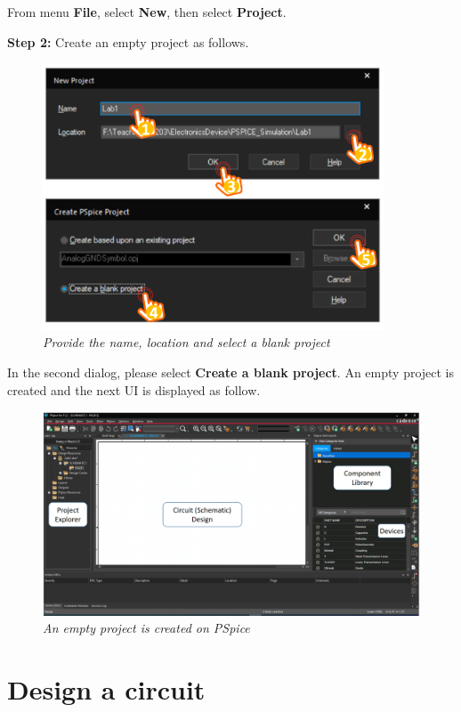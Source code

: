 From menu \textbf{File}, select \textbf{New}, then select \textbf{Project}.

\textbf{Step 2: } Create an empty project as follows.
\newpage
\begin{figure}[!htp]
    \centering
    \includegraphics[width=4in]{source/picture/bai_1/pic5.PNG}
    \caption{\textit{Provide the name, location and select a blank project}}
    \label{bai1_pic5}
\end{figure}

In the second dialog, please select \textbf{Create a blank project}. An empty project is created and the next UI is displayed as follow.
\begin{figure}[!htp]
    \centering
    \includegraphics[width=5.5in]{source/picture/bai_1/pic3.PNG}
    \caption{\textit{An empty project is created on PSpice}}
    \label{bai1_pic3}
\end{figure}

\section{Design a circuit}

